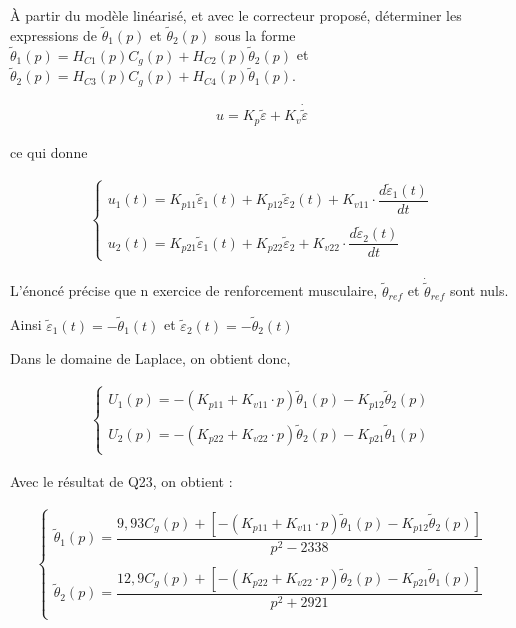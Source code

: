 \begin{question}
\label{2023_ccs_psi_q_26}
 À partir du modèle linéarisé, et avec le correcteur proposé, déterminer les expressions de $\tilde{\theta}_{1}(p)$ et $\tilde{\theta}_{2}(p)$ sous la forme $\tilde{\theta}_{1}(p)=H_{C 1}(p) C_{g}(p)+H_{C 2}(p) \tilde{\theta}_{2}(p)$ et $\tilde{\theta}_{2}(p)=H_{C 3}(p) C_{g}(p)+H_{C 4}(p) \tilde{\theta}_{1}(p)$.\\
\end{question}
\ifprof
\begin{corrige}
\begin{align*}
u=K_p\tilde{\varepsilon}+K_v\dot{\tilde{\varepsilon}}
\end{align*}

ce qui donne 

\begin{align*}
\left\{
\begin{array}{l}
u_1(t)=K_{p11}\tilde{\varepsilon}_1(t)+K_{p12}\tilde{\varepsilon}_2(t)+K_{v11} \cdot \dfrac{d \tilde{\varepsilon}_1(t)}{dt} \\
\\
u_2(t)=K_{p21}\tilde{\varepsilon}_1(t)+K_{p22}\tilde{\varepsilon}_2+K_{v22}\cdot \dfrac{d \tilde{\varepsilon}_2(t)}{dt}
\end{array}
\right.
\end{align*}

L'énoncé précise que n exercice de renforcement musculaire, $\tilde{\theta}_{ref}$ et $\dot{\tilde{\theta}}_{ref}$ sont nuls.

Ainsi $\tilde{\varepsilon}_1(t)=-\tilde{\theta}_1(t)$ et $\tilde{\varepsilon}_2(t)=-\tilde{\theta}_2(t)$

Dans le domaine de Laplace, on obtient donc,

\begin{align*}
\left\{
\begin{array}{l}
U_1(p)=-\left(K_{p11}+K_{v11}\cdot p\right)\tilde{\theta}_1(p)-K_{p12}\tilde{\theta}_2(p)\\
\\
U_2(p)=-\left(K_{p22}+K_{v22}\cdot p\right)\tilde{\theta}_2(p)-K_{p21}\tilde{\theta}_1(p)\\
\end{array}
\right.
\end{align*}

Avec le résultat de Q23, on obtient : 


\begin{align*}
\left\{
\begin{array}{l}
\tilde{\theta}_1(p)=\dfrac{9,93C_g(p)+\left[-\left(K_{p11}+K_{v11}\cdot p\right)\tilde{\theta}_1(p)-K_{p12}\tilde{\theta}_2(p)\right]}{p^2-2338}\\
\\
\tilde{\theta}_2(p)=\dfrac{12,9C_g(p)+\left[-\left(K_{p22}+K_{v22}\cdot p\right)\tilde{\theta}_2(p)-K_{p21}\tilde{\theta}_1(p)\right]}{p^2+2921}\\
\end{array}
\right.
\end{align*}


\end{corrige}
